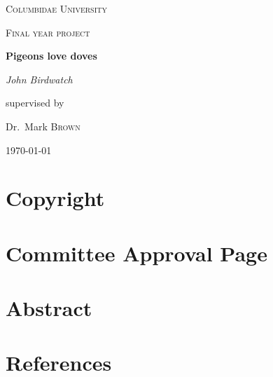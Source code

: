 \documentclass[12pt]{article}
\begin{document}
\begin{titlepage}
	\centering
	{\scshape\LARGE Columbidae University \par}
	\vspace{1cm}
	{\scshape\Large Final year project\par}
	\vspace{1.5cm}
	{\huge\bfseries Pigeons love doves\par}
	\vspace{2cm}
	{\Large\itshape John Birdwatch\par}
	\vfill
	supervised by\par
	Dr.~Mark \textsc{Brown}
	
	\vfill
	{\large \today\par}
\end{titlepage}

\section*{Copyright}
\newpage

\section*{Committee Approval Page}
\newpage

\section*{Abstract}
\newpage

\tableofcontents
\newpage

\listoffigures
\newpage

\listoftables
\newpage



\newpage

\newpage

\newpage

\newpage


\section*{References}


	
\end{document}
